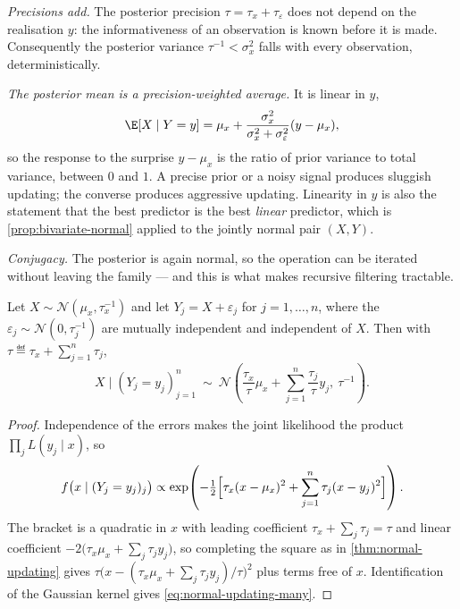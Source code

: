 \emph{Precisions add.} The posterior precision $\tau=\tau_x+\tau_\varepsilon$
does not depend on the realisation $y$: the informativeness of an observation is
known before it is made. Consequently the posterior variance
$\tau^{-1}<\sigma_x^{2}$ falls with every observation, deterministically.

\emph{The posterior mean is a precision-weighted average.} It is linear in $y$,
\[
	\E[X\mid Y=y]
	=\mu_x+\frac{\sigma_x^{2}}{\sigma_x^{2}+\sigma_\varepsilon^{2}}(y-\mu_x),
\]
so the response to the surprise $y-\mu_x$ is the ratio of prior variance to total
variance, between $0$ and $1$. A precise prior or a noisy signal produces
sluggish updating; the converse produces aggressive updating. Linearity in $y$ is
also the statement that the best predictor is the best \emph{linear} predictor,
which is \autoref{prop:bivariate-normal} applied to the jointly normal pair
$(X,Y)$.

\emph{Conjugacy.} The posterior is again normal, so the operation can be iterated
without leaving the family --- and this is what makes recursive filtering
tractable.

\begin{theorem}\label{thm:normal-updating-many}
	Let $X\sim\mathcal{N}(\mu_x,\tau_x^{-1})$ and let
	$Y_j=X+\varepsilon_j$ for $j=1,\dots,n$, where the
	$\varepsilon_j\sim\mathcal{N}(0,\tau_j^{-1})$ are mutually independent and
	independent of $X$. Then with $\tau\eqdef\tau_x+\sum_{j=1}^{n}\tau_j$,
	\begin{equation}\label{eq:normal-updating-many}
		X\mid(Y_j=y_j)_{j=1}^{n}\ \sim\
		\mathcal{N}\!\left(\frac{\tau_x}{\tau}\mu_x
		+\sum_{j=1}^{n}\frac{\tau_j}{\tau}y_j,\ \tau^{-1}\right).
	\end{equation}
\end{theorem}

\begin{proof}
	Independence of the errors makes the joint likelihood the product
	$\prod_{j}L(y_j\mid x)$, so
	\[
		f\bigl(x\mid(Y_j=y_j)_j\bigr)\propto
		\exp\!\left(-\tfrac12\Bigl[\tau_x(x-\mu_x)^{2}
			+\sum_{j=1}^{n}\tau_j(x-y_j)^{2}\Bigr]\right).
	\]
	The bracket is a quadratic in $x$ with leading coefficient
	$\tau_x+\sum_j\tau_j=\tau$ and linear coefficient
	$-2\bigl(\tau_x\mu_x+\sum_j\tau_jy_j\bigr)$, so completing the square as in
	\autoref{thm:normal-updating} gives
	$\tau\bigl(x-(\tau_x\mu_x+\sum_j\tau_jy_j)/\tau\bigr)^{2}$ plus terms free of
	$x$. Identification of the Gaussian kernel gives
	\eqref{eq:normal-updating-many}.
\end{proof}

